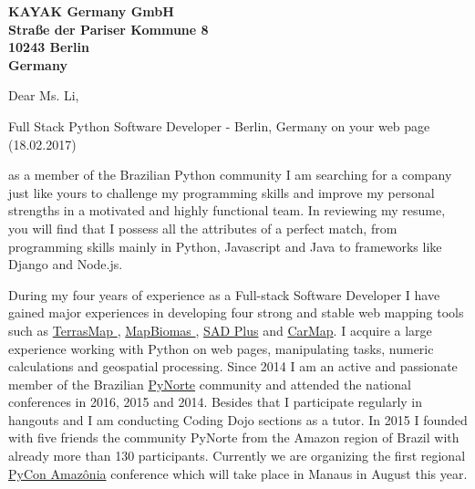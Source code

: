 \documentclass[a4paper]{joaosoares-letter}
\begin{document}
\longindentation=0pt


\begin{letter}{\bfseries KAYAK Germany GmbH\\Straße der Pariser Kommune 8\\10243 Berlin\\Germany}


\date{Belém, \today}


\opening{Dear Ms. Li,}{Full Stack Python Software Developer - Berlin, Germany on your web page (18.02.2017)}

as a member of the Brazilian Python community I am searching for a company just like yours to challenge my programming skills and improve my personal strengths in a motivated and highly functional team. In reviewing my resume, you will find that I possess all the attributes of a perfect match, from programming skills mainly in Python, Javascript and Java to frameworks like Django and Node.js.

During my four years of experience as a Full-stack Software Developer I have gained major experiences in developing four strong and stable web mapping tools such as \href{https://goo.gl/6gUzPA}{ TerrasMap }, \href{https://goo.gl/eYX5SW}{ MapBiomas }, \href{https://goo.gl/2J41hR}{SAD Plus} and \href{https://goo.gl/fCCp9s}{CarMap}. I acquire a large experience working with Python on web pages, manipulating tasks, numeric calculations and geospatial processing. Since 2014 I am an active and passionate member of the Brazilian \href{http://pynorte.python.org.br}{PyNorte} community and attended the national conferences in 2016, 2015 and 2014. Besides that I participate regularly in hangouts and I am conducting Coding Dojo sections as a tutor. In 2015 I founded with five friends the community PyNorte  from the Amazon region of Brazil with already more than 130 participants. Currently we are organizing the first regional \href{http://amazonia.python.org.br/}{PyCon Amazônia} conference which will take place in Manaus in August this year.


\end{letter}
\end{document}

